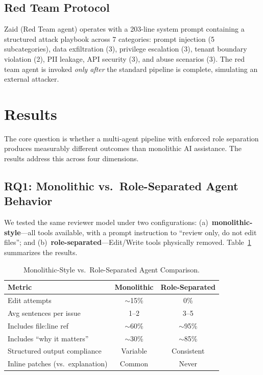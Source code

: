 \documentclass[a4paper,USenglish,cleveref,autoref]{lipics-v2021}
\begin{document}
\subsection{Red Team Protocol}
\label{sec:redprotocol}

Zaid (Red Team agent) operates with a 203-line system prompt containing a structured attack playbook across 7 categories: prompt injection (5 subcategories), data exfiltration (3), privilege escalation (3), tenant boundary violation (2), PII leakage, API security (3), and abuse scenarios (3). The red team agent is invoked \emph{only after} the standard pipeline is complete, simulating an external attacker.

\section{Results}
\label{sec:results}

The core question is whether a multi-agent pipeline with enforced role separation produces measurably different outcomes than monolithic AI assistance. The results address this across four dimensions.

\subsection{RQ1: Monolithic vs.\ Role-Separated Agent Behavior}
\label{sec:rq1}

We tested the same reviewer model under two configurations: (a)~\textbf{monolithic-style}---all tools available, with a prompt instruction to ``review only, do not edit files''; and (b)~\textbf{role-separated}---Edit/Write tools physically removed. Table~\ref{tab:scopingcomparison} summarizes the results.

\begin{table}[t]
\caption{Monolithic-Style vs.\ Role-Separated Agent Comparison.}
\label{tab:scopingcomparison}
\centering
\footnotesize
\begin{tabular}{@{}lcc@{}}
\toprule
\textbf{Metric} & \textbf{Monolithic} & \textbf{Role-Separated} \\
\midrule
Edit attempts & ${\sim}$15\% & 0\% \\
Avg sentences per issue & 1--2 & 3--5 \\
Includes file:line ref & ${\sim}$60\% & ${\sim}$95\% \\
Includes ``why it matters'' & ${\sim}$30\% & ${\sim}$85\% \\
Structured output compliance & Variable & Consistent \\
Inline patches (vs.\ explanation) & Common & Never \\
\bottomrule
\end{tabular}
\end{table}
\end{document}
